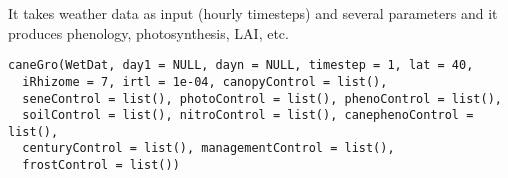\documentclass[letterpaper]{book}
\begin{document}
%
\begin{Description}\relax
It takes weather data as input (hourly timesteps) and
several parameters and it produces phenology,
photosynthesis, LAI, etc.
\end{Description}
%
\begin{Usage}
\begin{verbatim}
caneGro(WetDat, day1 = NULL, dayn = NULL, timestep = 1, lat = 40,
  iRhizome = 7, irtl = 1e-04, canopyControl = list(),
  seneControl = list(), photoControl = list(), phenoControl = list(),
  soilControl = list(), nitroControl = list(), canephenoControl = list(),
  centuryControl = list(), managementControl = list(),
  frostControl = list())
\end{verbatim}
\end{Usage}
%
\end{document}
